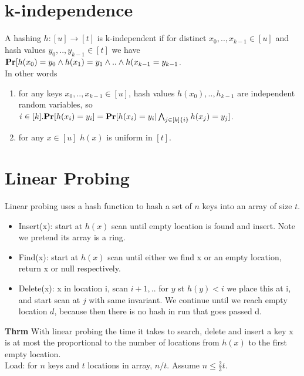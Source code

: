 \documentclass[a4paper]{article}
\def\Pr{\mbox{\textbf{Pr}}}
\begin{document}
\section{k-independence}
A hashing \(h:[u]\rightarrow [t]\) is k-independent if for distinct \(x_0,..,x_{k-1}\in [u]\) and hash values \(y_0,..,y_{k-1} \in [t]\) we have \(\Pr[h(x_0)=y_0 \wedge h(x_1)=y_1 \wedge .. \wedge h(x_{k-1}=y_{k-1}\).\\
In other words 
\begin{enumerate}
\item for any keys \(x_0,..,x_{k-1} \in [u]\), hash values \(h(x_0),..,h_{k-1}\) are independent random variables, so \(i\in [k]. \Pr[h(x_i) = y_i] = \Pr[h(x_i) = y_i |\bigwedge_{j \in [k]\\\{i\}}h(x_j) = y_j]\). 
\item for any \(x \in [u]\) \(h(x)\) is uniform in \([t]\).
\end{enumerate}
\section{Linear Probing}
Linear probing uses a hash function to hash a set of \(n\) keys into an array of size \(t\). 
\begin{itemize}
\item Insert(x): start at \(h(x)\) scan until empty location is found and insert. Note we pretend its array is a ring.
\item Find(x): start at \(h(x)\) scan until either we find x or an empty location, return x or null respectively.
\item Delete(x): x in location i, scan \(i+1,..\) for \(y\) st \(h(y) < i\) we place this at i, and start scan at \(j\) with same invariant. We continue until we reach empty location \(d\), because then there is no hash in run that goes passed d.
\end{itemize}
\textbf{Thrm} With linear probing the time it takes to search, delete and insert a key x is at most the proportional to the number of locations from \(h(x)\) to the first empty location.\\
Load: for \(n\) keys and \(t\) locations in array, \(n/t\). Assume \(n \leq \frac{2}{3}t\).
\end{document}
